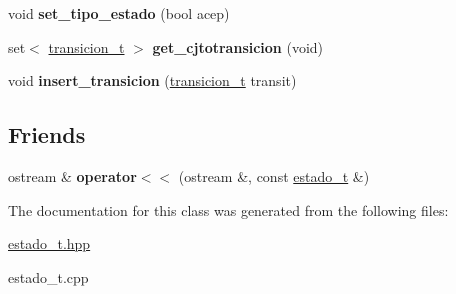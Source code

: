 \begin{DoxyCompactItemize}
\item 
\hypertarget{classestado__t_a51435f3e0a8c11763d9ab027ea22226c}{void {\bfseries set\-\_\-tipo\-\_\-estado} (bool acep)}\label{classestado__t_a51435f3e0a8c11763d9ab027ea22226c}

\item 
\hypertarget{classestado__t_a54ee96d6f39c5518967056bdc342cbd2}{set$<$ \hyperlink{classtransicion__t}{transicion\-\_\-t} $>$ {\bfseries get\-\_\-cjtotransicion} (void)}\label{classestado__t_a54ee96d6f39c5518967056bdc342cbd2}

\item 
\hypertarget{classestado__t_ab3752ae66e55aabf04e4797651649719}{void {\bfseries insert\-\_\-transicion} (\hyperlink{classtransicion__t}{transicion\-\_\-t} transit)}\label{classestado__t_ab3752ae66e55aabf04e4797651649719}

\end{DoxyCompactItemize}
\subsection*{Friends}
\begin{DoxyCompactItemize}
\item 
\hypertarget{classestado__t_aaf453bdc9256452e29049bc6dc10ec3a}{ostream \& {\bfseries operator$<$$<$} (ostream \&, const \hyperlink{classestado__t}{estado\-\_\-t} \&)}\label{classestado__t_aaf453bdc9256452e29049bc6dc10ec3a}

\end{DoxyCompactItemize}


The documentation for this class was generated from the following files\-:\begin{DoxyCompactItemize}
\item 
\hyperlink{estado__t_8hpp}{estado\-\_\-t.\-hpp}\item 
estado\-\_\-t.\-cpp\end{DoxyCompactItemize}
